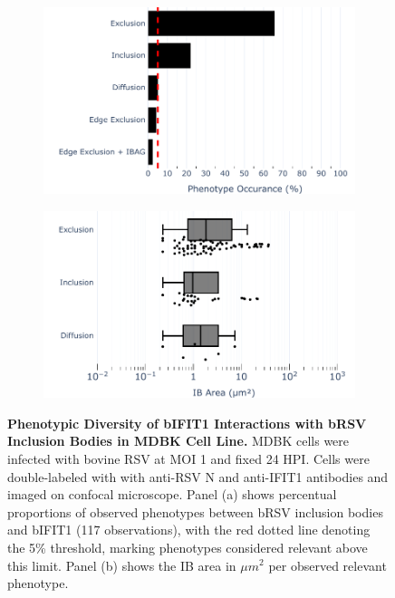 \begin{figure}
    \begin{subfigure}{0.495\textwidth}
        \caption{}
        \includegraphics[width=1\linewidth]{08. Chapter 3/Figs/02. Infection/01. IFIT1/07. bar_i1_mdbk.pdf} 
    \end{subfigure}
    \begin{subfigure}{0.495\textwidth}
        \caption{}
        \includegraphics[width=1\linewidth]{08. Chapter 3/Figs/02. Infection/01. IFIT1/08. box_i1_mdbk.pdf}
    \end{subfigure}
    \caption[Phenotypic Diversity of bIFIT1 Interactions with bRSV Inclusion Bodies in MDBK Cell Line.]{\textbf{Phenotypic Diversity of bIFIT1 Interactions with bRSV Inclusion Bodies in MDBK Cell Line.} MDBK cells were infected with bovine RSV at MOI 1 and fixed 24 HPI. Cells were double-labeled with with anti-RSV N and anti-IFIT1 antibodies and imaged on confocal microscope. Panel (a) shows percentual proportions of observed phenotypes between bRSV inclusion bodies and bIFIT1 (117 observations), with the red dotted line denoting the 5\% threshold, marking phenotypes considered relevant above this limit. Panel (b) shows the IB area in \(\mu m^2\) per observed relevant phenotype.}
    \label{fig:Phenotypic Diversity of bIFIT1 Interactions with bRSV Inclusion Bodies in MDBK Cell Line}
\end{figure}

